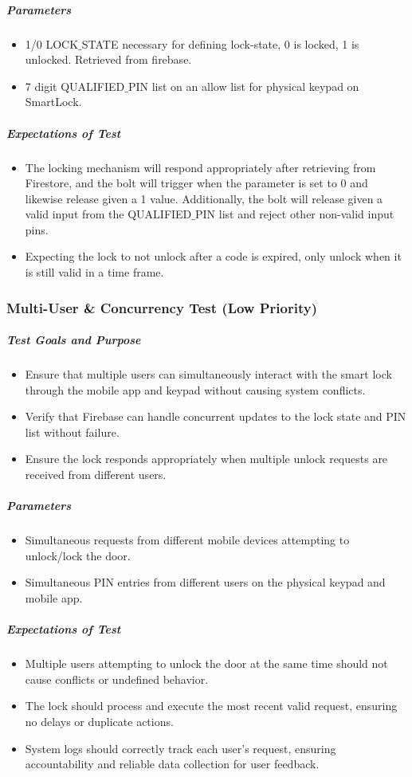 \subparagraph{Parameters}
\begin{itemize}
    \item 1/0 LOCK$\_$STATE necessary for defining lock-state, 0 is locked, 1 is unlocked. Retrieved from firebase.
    \item 7 digit QUALIFIED$\_$PIN list on an allow list for physical keypad on SmartLock.
\end{itemize}

\subparagraph{Expectations of Test}
\begin{itemize}
    \item The locking mechanism will respond appropriately after retrieving from Firestore, and the bolt will trigger when the parameter is set to 0 and likewise release given a 1 value. Additionally, the bolt will release given a valid input from the QUALIFIED$\_$PIN list and reject other non-valid input pins.
    \item Expecting the lock to not unlock after a code is expired, only unlock when it is still valid in a time frame.
\end{itemize}

\subsubsection{Multi-User \& Concurrency Test (Low Priority)}
\subparagraph{Test Goals and Purpose}
\begin{itemize}
    \item Ensure that multiple users can simultaneously interact with the smart lock through the mobile app and keypad without causing system conflicts.
    \item Verify that Firebase can handle concurrent updates to the lock state and PIN list without failure.
    \item Ensure the lock responds appropriately when multiple unlock requests are received from different users.
\end{itemize}


\subparagraph{Parameters}
\begin{itemize}
    \item Simultaneous requests from different mobile devices attempting to unlock/lock the door.
    \item Simultaneous PIN entries from different users on the physical keypad and mobile app.
\end{itemize}

\subparagraph{Expectations of Test}
\begin{itemize}
    \item Multiple users attempting to unlock the door at the same time should not cause conflicts or undefined behavior.
    \item The lock should process and execute the most recent valid request, ensuring no delays or duplicate actions.
    \item System logs should correctly track each user’s request, ensuring accountability and reliable data collection for user feedback.
\end{itemize}
\newpage

